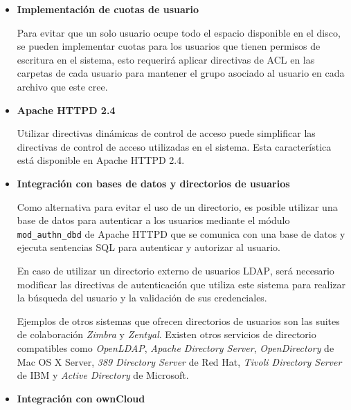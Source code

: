 \begin{itemize}
  \item \textbf{Implementaci\'{o}n de cuotas de usuario}

Para evitar que un solo usuario ocupe todo el espacio disponible en el disco, se pueden implementar cuotas para los usuarios que tienen permisos de escritura en el sistema, esto requerir\'{a} aplicar directivas de \textsc{\gls{ACL}} en las carpetas de cada usuario para mantener el grupo asociado al usuario en cada archivo que este cree. 

  \item \textbf{Apache \textsc{HTTPD} 2.4}

Utilizar directivas din\'{a}micas de control de acceso puede simplificar las directivas de control de acceso utilizadas en el sistema. Esta caracter\'{i}stica est\'{a} disponible en Apache \textsc{HTTPD} 2.4.%

  \item \textbf{Integraci\'{o}n con bases de datos y directorios de usuarios}


Como alternativa para evitar el uso de un directorio, es posible utilizar una base de datos para autenticar a los usuarios mediante el m\'{o}dulo \texttt{mod\_authn\_dbd} de Apache \textsc{HTTPD} que se comunica con una base de datos y ejecuta sentencias \textsc{SQL} para autenticar y autorizar al usuario.

En caso de utilizar un directorio externo de usuarios \textsc{\gls{LDAP}}, ser\'{a} necesario modificar las directivas de autenticaci\'{o}n que utiliza este sistema para realizar la b\'{u}squeda del usuario y la validaci\'{o}n de sus credenciales.

Ejemplos de otros sistemas que ofrecen directorios de usuarios son las suites de colaboraci\'{o}n \textsl{Zimbra} y \textsl{Zentyal}.  Existen otros servicios de directorio compatibles como \textit{OpenLDAP}, \textit{Apache Directory Server}, \textit{OpenDirectory} de Mac OS X Server, \textit{389 Directory Server} de Red Hat, \textit{Tivoli Directory Server} de IBM y \textit{Active Directory} de Microsoft.

  \item \textbf{Integraci\'{o}n con ownCloud}


\end{itemize}
